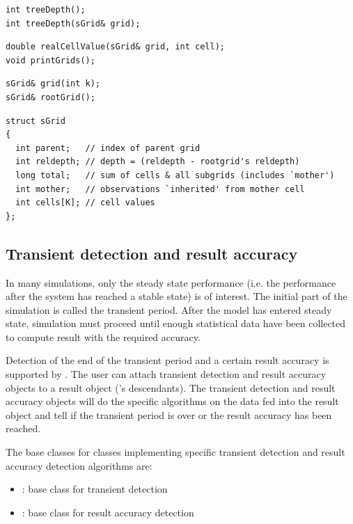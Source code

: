 \begin{verbatim}
int treeDepth();
int treeDepth(sGrid& grid);
\end{verbatim}

\begin{verbatim}
double realCellValue(sGrid& grid, int cell);
void printGrids();
\end{verbatim}

\begin{verbatim}
sGrid& grid(int k);
sGrid& rootGrid();
\end{verbatim}

\begin{verbatim}
struct sGrid
{
  int parent;   // index of parent grid
  int reldepth; // depth = (reldepth - rootgrid's reldepth)
  long total;   // sum of cells & all subgrids (includes `mother')
  int mother;   // observations `inherited' from mother cell
  int cells[K]; // cell values
};
\end{verbatim}



\subsection{Transient detection and result accuracy}

In many simulations, only the steady state performance (i.e.
the performance after the system has reached a stable state)
is of interest. The initial part of the simulation is called
the transient period. After the model has entered steady state,
simulation must proceed until enough statistical data have been
collected to compute result with the required accuracy.


Detection of the end of the transient period and a certain result
accuracy is supported by {\opp}. The user can attach transient
detection and result accuracy objects to a result object ('s
descendants). The transient detection and result accuracy objects will
do the specific algorithms on the data fed into the result object and
tell if the transient period is over or the result accuracy has been
reached.

The base classes for classes implementing specific transient
detection and result accuracy detection algorithms are:
\begin{itemize}
\item{: base class for transient detection}
\item{: base class for result accuracy detection}
\end{itemize}


